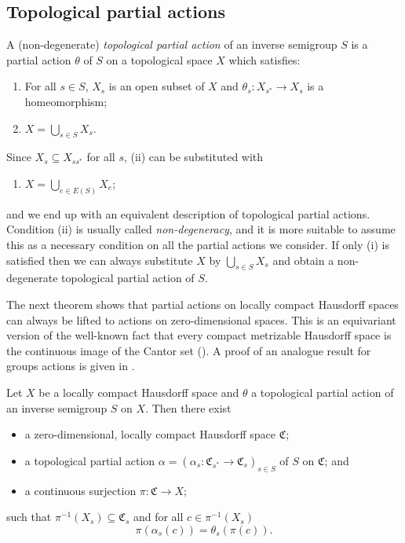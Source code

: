 \subsection{Topological partial actions}

\begin{definition}
A (non-degenerate) \emph{topological partial action} of an inverse semigroup $S$ is a partial action $\theta$ of $S$ on a topological space $X$ which satisfies:
\begin{enumerate}
\item[(i)] For all $s\in S$, $X_s$ is an open subset of $X$ and $\theta_s:X_{s^*}\to X_s$ is a homeomorphism;
\item[(ii)] $X=\bigcup_{s\in S}X_s$.
\end{enumerate}
\end{definition}

Since $X_s\subseteq X_{ss^*}$ for all $s$, (ii) can be substituted with
\begin{enumerate}
\item[(ii')] $X=\bigcup_{e\in E(S)} X_e$;
\end{enumerate}
and we end up with an equivalent description of topological partial actions. Condition (ii)  is usually called \emph{non-degeneracy}, and it is more suitable to assume this as a necessary condition on all the partial actions we consider. If only (i) is satisfied then we can always substitute $X$ by $\bigcup_{s\in S}X_s$ and obtain a non-degenerate topological partial action of $S$. 

The next theorem shows that partial actions on locally compact Hausdorff spaces can always be lifted to actions on zero-dimensional spaces. This is an equivariant version of the well-known fact that every compact metrizable Hausdorff space is the continuous image of the Cantor set (\cite{Alexandroff1927}). A proof of an analogue result for groups actions is given in \cite{MR1456297}.

\begin{theorem}
Let $X$ be a locally compact Hausdorff space and $\theta$ a topological partial action of an inverse semigroup $S$ on $X$. Then there exist
\begin{itemize}
\item a zero-dimensional, locally compact Hausdorff space $\mathfrak{C}$;
\item a topological partial action $\alpha=(\alpha_s:\mathfrak{C}_{s^*}\to\mathfrak{C}_s)_{s\in S}$ of $S$ on $\mathfrak{C}$; and
\item a continuous surjection $\pi:\mathfrak{C}\to X$;
\end{itemize}
such that $\pi^{-1}(X_s)\subseteq\mathfrak{C}_s$ and for all $c\in\pi^{-1}(X_s)$
\[\pi(\alpha_s(c))=\theta_s(\pi(c)).\]
\end{theorem}

